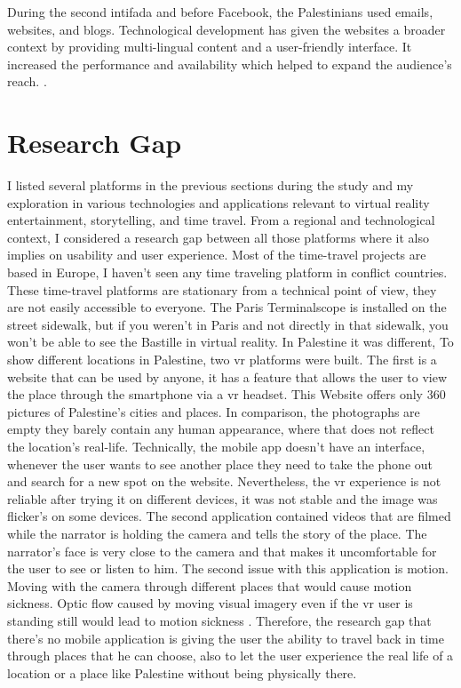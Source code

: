 During the second intifada and before Facebook, the Palestinians used emails, websites, and blogs. Technological development has given the websites a broader context by providing multi-lingual content and a user-friendly interface. It increased the performance and availability which helped to expand the audience's reach. \citep{Aouragh2011}. 

\section{Research Gap}

I listed several platforms in the previous sections during the study and my exploration in various technologies and applications relevant to virtual reality entertainment, storytelling, and time travel. From a regional and technological context, I considered a research gap between all those platforms where it also implies on usability and user experience. Most of the time-travel projects are based in Europe, I haven't seen any time traveling platform in conflict countries. These time-travel platforms are stationary from a technical point of view, they are not easily accessible to everyone. The Paris Terminalscope is installed on the street sidewalk, but if you weren't in Paris and not directly in that sidewalk, you won't be able to see the Bastille in virtual reality. In Palestine it was different, To show different locations in Palestine, two \acrshort{vr} platforms were built. The first is a website that can be used by anyone, it has a feature that allows the user to view the place through the smartphone via a \acrshort{vr} headset. This Website offers only 360 pictures of Palestine's cities and places. In comparison, the photographs are empty they barely contain any human appearance, where that does not reflect the location's real-life. Technically, the mobile app doesn't have an interface, whenever the user wants to see another place they need to take the phone out and search for a new spot on the website. Nevertheless, the \acrshort{vr} experience is not reliable after trying it on different devices, it was not stable and the image was flicker's on some devices. The second application contained videos that are filmed while the narrator is holding the camera and tells the story of the place. The narrator's face is very close to the camera and that makes it uncomfortable for the user to see or listen to him. The second issue with this application is motion. Moving with the camera through different places that would cause motion sickness. Optic flow caused by moving visual imagery even if the \acrshort{vr} user is standing still would lead to motion sickness \citep{Steinicke2016}. Therefore, the research gap that there's no mobile application is giving the user the ability to travel back in time through places that he can choose, also to let the user experience the real life of a location or a place like Palestine without being physically there. 